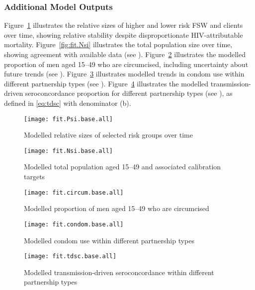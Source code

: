 \subsubsection{Additional Model Outputs}\label{sr.cal.other}
Figure~\ref{fig:fit.Psi} illustrates
the relative sizes of higher and lower risk FSW and clients over time,
showing relative stability despite disproportionate HIV-attributable mortality.
Figure~\ref{fig:fit.Nsi} illustrates the total population size over time,
showing agreement with available data \cite{WorldBank} (see ).
Figure~\ref{fig:fit.circum} illustrates
the modelled proportion of men aged 15--49 who are circumcised,
including uncertainty about future trends (see ).
Figure~\ref{fig:fit.condom} illustrates
modelled trends in condom use within different partnership types (see ).
Figure~\ref{fig:fit.tdsc} illustrates
the modelled transmission-driven seroconcordance proportion
for different partnership types (see ),
as defined in \eqref{eq:tdsc} with denominator (b).
\begin{figure}
  \centering\texttt{[image: fit.Psi.base.all]}
  \caption{Modelled relative sizes of selected risk groups over time}
  \label{fig:fit.Psi}
\end{figure}
\begin{figure}
  \begin{minipage}[t]{.45\linewidth}
    \centering\texttt{[image: fit.Nsi.base.all]}
    \caption{Modelled total population aged 15--49
      and associated calibration targets}
    \label{fig:fit.Nsi}
  \end{minipage}\hfill
  \begin{minipage}[t]{.45\linewidth}
    \centering\texttt{[image: fit.circum.base.all]}
    \caption{Modelled proportion of men aged 15--49 who are circumcised}
    \label{fig:fit.circum}
  \end{minipage}
\end{figure}
\begin{figure}
  \centering\texttt{[image: fit.condom.base.all]}
  \caption{Modelled condom use within different partnership types}
  \label{fig:fit.condom}
\end{figure}
\begin{figure}
  \centering\texttt{[image: fit.tdsc.base.all]}
  \caption{Modelled transmission-driven seroconcordance within different partnership types}
  \label{fig:fit.tdsc}
\end{figure}
